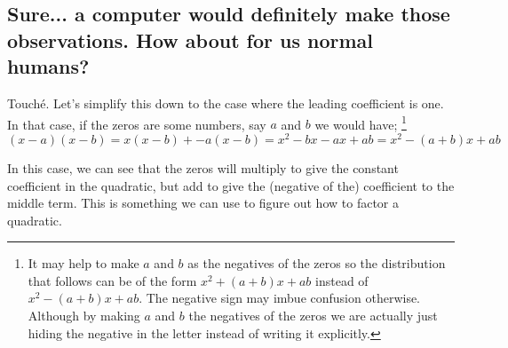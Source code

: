\documentclass{ximeraXloud}
\begin{document}
    \subsection*{Sure... a computer would definitely make those observations. How about for us normal humans?}
        Touché. Let's simplify this down to the case where the leading coefficient is one. In that case, if the zeros are some numbers, say $a$ and $b$ we would have;%
        \footnote{%
            It may help to make $a$ and $b$ as the negatives of the zeros so the distribution that follows can be of the form $x^2 + (a + b)x + ab$ instead of $x^2 - (a + b)x + ab$. The negative sign may imbue confusion otherwise. Although by making $a$ and $b$ the negatives of the zeros we are actually just hiding the negative in the letter instead of writing it explicitly.%
            }%
        \[
            (x-a)(x-b) = x(x-b) + -a(x-b) = x^2 - bx - ax + ab = x^2 - (a + b)x + ab
        \]
        
        In this case, we can see that the zeros will multiply to give the constant coefficient in the quadratic, but add to give the (negative of the) coefficient to the middle term. This is something we can use to figure out how to factor a quadratic.
        
\end{document}
